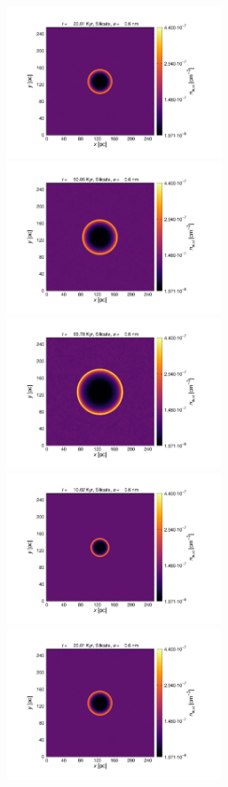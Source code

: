 \documentclass[fleqn,usenatbib]{mnras}
\begin{document}
\begin{figure}
 \includegraphics[trim=5.2cm 1.5cm 9.3cm 2.0cm, clip=true,page=2,height = 4.5cm]{Pics/Pics_C1/Density_1_00081.pdf}\hspace*{-0.1cm}
 \includegraphics[trim=5.2cm 1.5cm 9.3cm 2.0cm, clip=true,page=2,height = 4.5cm]{Pics/Pics_C1/Density_1_00201.pdf}\hspace*{-0.1cm}
 \includegraphics[trim=5.2cm 1.5cm 3.2cm 2.0cm, clip=true,page=2,height = 4.5cm]{Pics/Pics_C1/Density_1_00400.pdf}\\
  \includegraphics[trim=2.8cm 1.5cm 9.3cm 2.0cm, clip=true,page=3,height = 4.5cm]{Pics/Pics_C1/Density_1_00041.pdf}\hspace*{-0.1cm}
 \includegraphics[trim=5.2cm 1.5cm 9.3cm 2.0cm, clip=true,page=3,height = 4.5cm]{Pics/Pics_C1/Density_1_00081.pdf}\hspace*{-0.1cm}

\end{figure}
\end{document}
